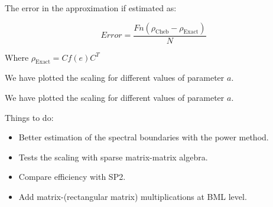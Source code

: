 \vspace{0.5cm}

The error in the approximation if estimated as: 

\begin{equation}
   Error = \frac{Fn(\rho_{\mathrm{Cheb}} - \rho_{\mathrm{Exact}})}{N}
\end{equation}

\vspace{0.5cm}

Where $\rho_{\mathrm{Exact}} = C f(e) C^T$

We have plotted the scaling for different values of parameter $a$.

   \begin{center}
   \end{center}  

We have plotted the scaling for different values of parameter $a$.

   \begin{center}
   \end{center}  

Things to do:
\begin{itemize}
 \item Better estimation of the spectral boundaries with the power method.
 \item Tests the scaling with sparse matrix-matrix algebra. 
 \item Compare efficiency with SP2.
 \item Add matrix-(rectangular matrix) multiplications at BML level.
\end{itemize}

